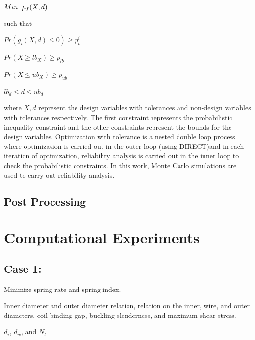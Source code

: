 \documentclass[10pt]{article}
\begin{document}
\centerline{$Min \hspace{2mm} \mu_{f} (X,d)$}

such that

\centerline{$Pr(g_{i}(X,d) \leq 0)\geq p_{t}^{i}$}
\centerline{$Pr(X \geq lb_{X})\geq p_{lb}$}
\centerline{$Pr(X \leq ub_{X})\geq p_{ub}$}
\centerline{$lb_{d} \leq d \leq ub_{d}$}

\noindent where $X,d$ represent the design variables with tolerances and non-design variables with tolerances respectively. The first constraint represents the probabilistic inequality constraint and the other constraints represent the bounds for the design variables. Optimization with tolerance is a nested double loop process where optimization is carried out in the outer loop (using DIRECT)and in each iteration of optimization, reliability analysis is carried out in the inner loop to check the probabilistic constraints. In this work, Monte Carlo simulations are used to carry out reliability analysis. 

\cite{Derivative} \cite{DirectPaper} \cite{MATLAB:2014a} \cite{DirectUserGuide}
 
\subsection{Post Processing}
\label{subsec:Post_Processing}

\section{Computational Experiments}
\label{sec:Computational_Experiments}


\newpage
\subsection{Case 1:}
\label{subsec:Case1}

\begin{description}[leftmargin=!,labelwidth=\widthof{\bfseries State Variables:}, labelindent = 1cm]
 	\item [Objectives:] Minimize spring rate and spring index.\\

	\item[Constraints:] Inner diameter and outer diameter relation, relation on the inner, wire, and outer diameters, coil binding gap, buckling slenderness, and maximum shear stress. \\
	\item[State Variables:] $d_{i}$, $d_{w}$, and $N_{t}$ \\
\end{description}
\end{document}
